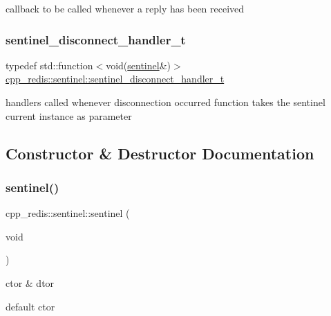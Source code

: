 callback to be called whenever a reply has been received \mbox{\label{classcpp__redis_1_1sentinel_a923e06b5b700c16dffec8a01d2fa9aa4}} 
\subsubsection{\texorpdfstring{sentinel\+\_\+disconnect\+\_\+handler\+\_\+t}{sentinel\_disconnect\_handler\_t}}
{\footnotesize\ttfamily typedef std\+::function$<$void(\hyperlink{classcpp__redis_1_1sentinel}{sentinel}\&)$>$ \hyperlink{classcpp__redis_1_1sentinel_a923e06b5b700c16dffec8a01d2fa9aa4}{cpp\+\_\+redis\+::sentinel\+::sentinel\+\_\+disconnect\+\_\+handler\+\_\+t}}

handlers called whenever disconnection occurred function takes the sentinel current instance as parameter 

\subsection{Constructor \& Destructor Documentation}
\mbox{\label{classcpp__redis_1_1sentinel_a2ea5a80a9139d5192706988521a2ae34}} 
\subsubsection{\texorpdfstring{sentinel()}{sentinel()}\hspace{0.1cm}{\footnotesize\ttfamily [1/3]}}
{\footnotesize\ttfamily cpp\+\_\+redis\+::sentinel\+::sentinel (\begin{DoxyParamCaption}\item[{void}]{ }\end{DoxyParamCaption})}



ctor \& dtor 

default ctor \mbox{\label{classcpp__redis_1_1sentinel_af53665f5834dfe5861a6310318ae5169}} 
